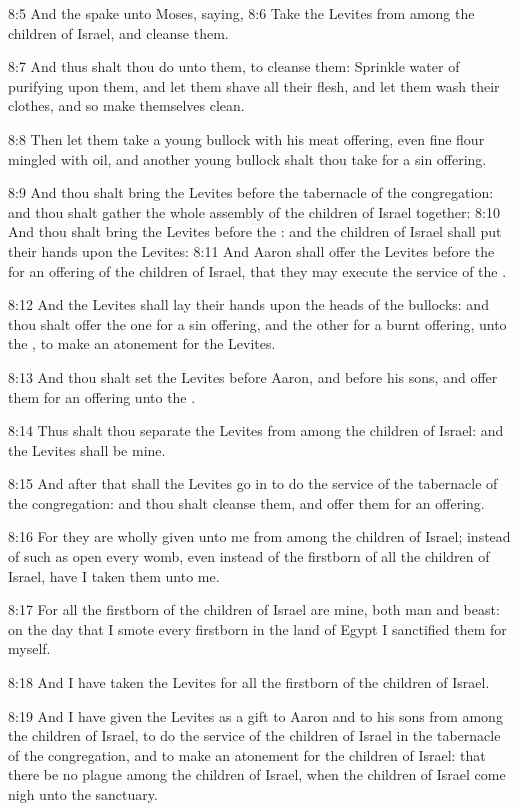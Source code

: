 8:5 And the \LORD spake unto Moses, saying, 8:6 Take the Levites from among the children of Israel, and cleanse them.

8:7 And thus shalt thou do unto them, to cleanse them: Sprinkle water of purifying upon them, and let them shave all their flesh, and let them wash their clothes, and so make themselves clean.

8:8 Then let them take a young bullock with his meat offering, even fine flour mingled with oil, and another young bullock shalt thou take for a sin offering.

8:9 And thou shalt bring the Levites before the tabernacle of the congregation: and thou shalt gather the whole assembly of the children of Israel together: 8:10 And thou shalt bring the Levites before the \LORD: and the children of Israel shall put their hands upon the Levites: 8:11 And Aaron shall offer the Levites before the \LORD for an offering of the children of Israel, that they may execute the service of the \LORD.

8:12 And the Levites shall lay their hands upon the heads of the bullocks: and thou shalt offer the one for a sin offering, and the other for a burnt offering, unto the \LORD, to make an atonement for the Levites.

8:13 And thou shalt set the Levites before Aaron, and before his sons, and offer them for an offering unto the \LORD.

8:14 Thus shalt thou separate the Levites from among the children of Israel: and the Levites shall be mine.

8:15 And after that shall the Levites go in to do the service of the tabernacle of the congregation: and thou shalt cleanse them, and offer them for an offering.

8:16 For they are wholly given unto me from among the children of Israel; instead of such as open every womb, even instead of the firstborn of all the children of Israel, have I taken them unto me.

8:17 For all the firstborn of the children of Israel are mine, both man and beast: on the day that I smote every firstborn in the land of Egypt I sanctified them for myself.

8:18 And I have taken the Levites for all the firstborn of the children of Israel.

8:19 And I have given the Levites as a gift to Aaron and to his sons from among the children of Israel, to do the service of the children of Israel in the tabernacle of the congregation, and to make an atonement for the children of Israel: that there be no plague among the children of Israel, when the children of Israel come nigh unto the sanctuary.

